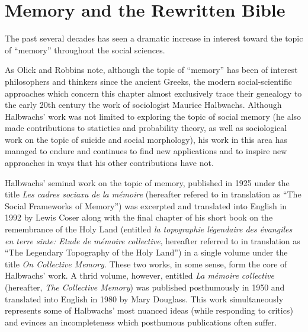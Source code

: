 \hypertarget{memory-and-the-rwb}{%
\chapter{Memory and the Rewritten Bible}\label{memory-and-the-rwb}}

The past several decades has seen a dramatic increase in interest toward
the topic of ``memory'' throughout the social sciences.

As Olick and Robbins note, although the topic of ``memory'' has been of
interest philosophers and thinkers since the ancient Greeks, the modern
social-scientific approaches which concern this chapter almost
exclusively trace their genealogy to the early 20th century the work of
sociologist Maurice Halbwachs.\autocite[106]{olick-robbins_ars1998}
Although Halbwachs' work was not limited to exploring the topic of
social memory (he also made contributions to statictics and probability
theory, as well as sociological work on the topic of suicide and social
morphology\autocite[13--20]{coser_halbwachs1992}), his work in this area
has managed to endure and continues to find new applications and to
inspire new approaches in ways that his other contributions have not.

Halbwachs' seminal work on the topic of memory, published in 1925 under
the title \emph{Les cadres sociaxu de la mémoire} (hereafter refered to
in translation as ``The Social Frameworks of Memory'') was excerpted and
translated into English in 1992 by Lewis Coser along with the final
chapter of his short book on the remembrance of the Holy Land (entitled
\emph{la topographie légendaire des évangiles en terre sinte: Etude de
mémoire collective}, hereafter referred to in translation as ``The
Legendary Topography of the Holy Land'') in a single volume under the
title \emph{On Collective Memory}.\autocite{halbwachs1992} These two
works, in some sense, form the core of Halbwachs' work. A thrid volume,
however, entitled \emph{La mémoire collective} (hereafter, \emph{The
Collective Memory}) was published posthumously in 1950 and translated
into English in 1980 by Mary Douglass. This work simultaneously
represents some of Halbwachs' most nuanced ideas (while responding to
critics) and evinces an incompleteness which posthumous publications
often suffer.\autocite[\^{} Coser observes, ``One may doubt that the
author himself would have been willing to publish it in what seems to be
an unfinished state. The book nevertheless contains many further
developments of Halbwachs's thought in regard to such matters as the
relation of space and time to collective memory as well as fruitful
definitions and applications of the differences between individual,
collective, and historical memory.''][2]{coser_halbwachs1992}
